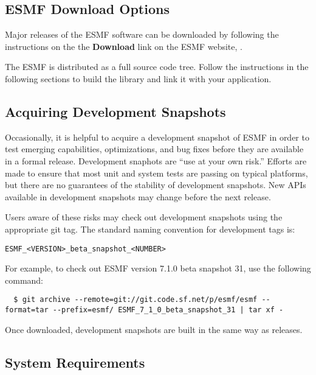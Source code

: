 
\subsection{ESMF Download Options}

Major releases of the ESMF software can be downloaded by following
the instructions on the the {\bf Download} link on the ESMF 
website, .

The ESMF is distributed as a full source code tree.
Follow the instructions in the following sections
to build the library and link it with your application.

\subsection{Acquiring Development Snapshots}
Occasionally, it is helpful to acquire a development snapshot of ESMF
in order to test emerging capabilities, optimizations, and bug fixes
before they are available in a formal release.  Development snaphots
are ``use at your own risk.'' Efforts are made to ensure that most unit
and system tests are passing on typical platforms, but there are no
guarantees of the stability of development snapshots. New APIs available
in development snapshots may change before the next release.

Users aware of these risks may check out development snapshots
using the appropriate git tag.  The standard naming convention
for development tags is:

\begin{verbatim}
ESMF_<VERSION>_beta_snapshot_<NUMBER>
\end{verbatim}

For example, to check out ESMF version 7.1.0 beta snapshot 31, use the
following command:

\begin{verbatim}
  $ git archive --remote=git://git.code.sf.net/p/esmf/esmf --format=tar --prefix=esmf/ ESMF_7_1_0_beta_snapshot_31 | tar xf -
\end{verbatim}

Once downloaded, development snapshots are built in the same way as releases.

\subsection{System Requirements}
\label{sec:systemreq}


